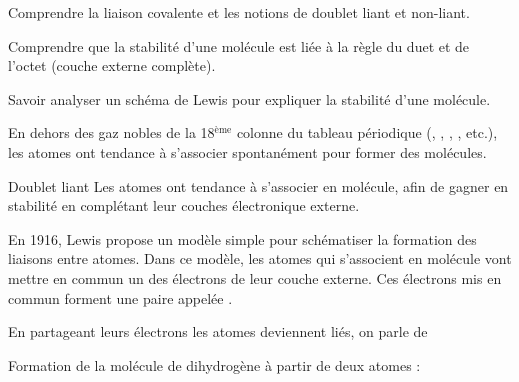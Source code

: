 \teteSndMole

\vspace*{-20pt}


\begin{objectifs}
  \item Comprendre la liaison covalente et les notions de doublet liant et non-liant.
  \item Comprendre que la stabilité d'une molécule est liée à la règle du duet et de l'octet (couche externe complète).
  \item Savoir analyser un schéma de Lewis pour expliquer la stabilité d'une molécule.
\end{objectifs}

\begin{contexte}
  En dehors des gaz nobles de la 18$^\text{ème}$ colonne du tableau périodique (, , , , etc.), les atomes ont tendance à s'associer spontanément pour former des molécules. 
  
\end{contexte}



\begin{doc}{Doublet liant}
  Les atomes ont tendance à s'associer en molécule, afin de gagner en stabilité en complétant leur couches électronique externe.
  
  En 1916, Lewis propose un modèle simple pour schématiser la formation des liaisons entre atomes.
  Dans ce modèle, les atomes qui s'associent en molécule vont mettre en commun un des électrons de leur couche externe.
  Ces électrons mis en commun forment une paire appelée \og {} \fg.
  
  En partageant leurs électrons les atomes deviennent liés, on parle de 
  
  \exemple Formation de la molécule de dihydrogène  à partir de deux atomes  :
  \vspace{8pt}
  
\end{doc}

